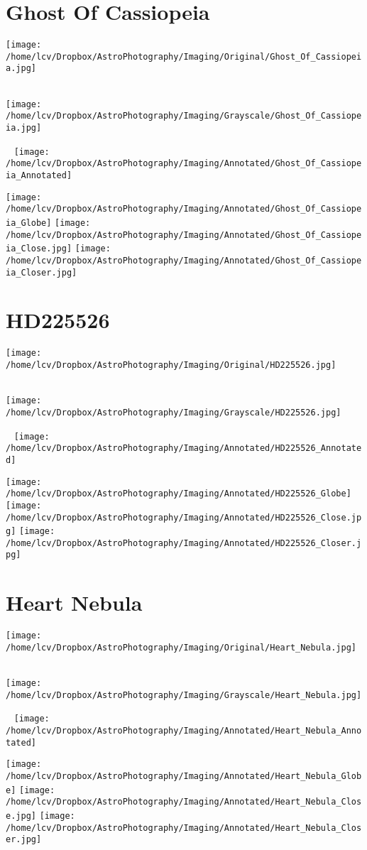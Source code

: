 \section{Ghost Of Cassiopeia}
\texttt{[image: /home/lcv/Dropbox/AstroPhotography/Imaging/Original/Ghost\_Of\_Cassiopeia.jpg]}
{\footnotesize\color{white}

}\ \\
\texttt{[image: /home/lcv/Dropbox/AstroPhotography/Imaging/Grayscale/Ghost\_Of\_Cassiopeia.jpg]}
\begin{center}
 \ \newpage
\texttt{[image: /home/lcv/Dropbox/AstroPhotography/Imaging/Annotated/Ghost\_Of\_Cassiopeia\_Annotated]}

\texttt{[image: /home/lcv/Dropbox/AstroPhotography/Imaging/Annotated/Ghost\_Of\_Cassiopeia\_Globe]}
\texttt{[image: /home/lcv/Dropbox/AstroPhotography/Imaging/Annotated/Ghost\_Of\_Cassiopeia\_Close.jpg]}
\texttt{[image: /home/lcv/Dropbox/AstroPhotography/Imaging/Annotated/Ghost\_Of\_Cassiopeia\_Closer.jpg]}
\end{center}
\section{HD225526}
\texttt{[image: /home/lcv/Dropbox/AstroPhotography/Imaging/Original/HD225526.jpg]}
{\footnotesize\color{white}

}\ \\
\texttt{[image: /home/lcv/Dropbox/AstroPhotography/Imaging/Grayscale/HD225526.jpg]}
\begin{center}
 \ \newpage
\texttt{[image: /home/lcv/Dropbox/AstroPhotography/Imaging/Annotated/HD225526\_Annotated]}

\texttt{[image: /home/lcv/Dropbox/AstroPhotography/Imaging/Annotated/HD225526\_Globe]}
\texttt{[image: /home/lcv/Dropbox/AstroPhotography/Imaging/Annotated/HD225526\_Close.jpg]}
\texttt{[image: /home/lcv/Dropbox/AstroPhotography/Imaging/Annotated/HD225526\_Closer.jpg]}
\end{center}
\section{Heart Nebula}
\texttt{[image: /home/lcv/Dropbox/AstroPhotography/Imaging/Original/Heart\_Nebula.jpg]}
{\footnotesize\color{white}

}\ \\
\texttt{[image: /home/lcv/Dropbox/AstroPhotography/Imaging/Grayscale/Heart\_Nebula.jpg]}
\begin{center}
 \ \newpage
\texttt{[image: /home/lcv/Dropbox/AstroPhotography/Imaging/Annotated/Heart\_Nebula\_Annotated]}

\texttt{[image: /home/lcv/Dropbox/AstroPhotography/Imaging/Annotated/Heart\_Nebula\_Globe]}
\texttt{[image: /home/lcv/Dropbox/AstroPhotography/Imaging/Annotated/Heart\_Nebula\_Close.jpg]}
\texttt{[image: /home/lcv/Dropbox/AstroPhotography/Imaging/Annotated/Heart\_Nebula\_Closer.jpg]}
\end{center}
